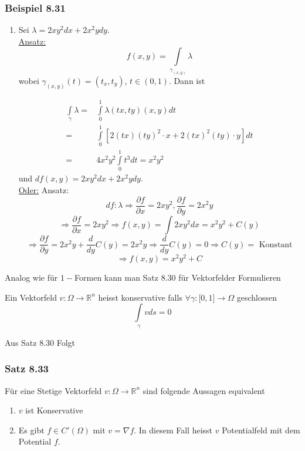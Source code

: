 \subsubsection*{Beispiel 8.31}
\begin{enumerate}
\item Sei $\lambda = 2xy^2dx+2x^2ydy$. \\

\noindent\underline{Ansatz:} $$f\left(x,y\right)=\int\limits_{\gamma_{\left( x,y\right)}}\lambda$$
wobei $\gamma_{\left( x,y\right)}\left(t\right)=\left(t_x,t_y\right)$, $t\in\left( 0,1\right)$. Dann ist
 
\begin{align*}
\int\limits_\gamma  \lambda   = &\int\limits_0^1 {\lambda \left( {tx,ty} \right)\left( {x,y} \right)dt} \\
= &\int\limits_0^1 {\left[ {2\left( {tx} \right){{\left( {ty} \right)}^2} \cdot x + 2{{\left( {tx} \right)}^2}\left( {ty} \right) \cdot y} \right]dt} \\
= & 4{x^2}{y^2}\int\limits_0^1 {{t^3}} dt = {x^2}{y^2}
\end{align*}
und $df\left( x,y\right)=2xy^2dx+2x^2ydy$.\\

\noindent\underline{Oder:} Ansatz: 
$$df:\lambda \Rightarrow\frac{\partial f}{\partial x}=  2xy^2, \frac{\partial f}{\partial y}=  2x^2y$$
$$\Rightarrow \frac{\partial f}{\partial x}=2xy^2 \Rightarrow f\left( x,y \right) = \int 2xy^2 dx =  x^2y^2+C\left( y\right)$$
$$\Rightarrow\frac{\partial f}{\partial y}=2x^2y+\frac{d}{dy}C\left(y\right)=2x^2y \Rightarrow \frac{d}{dy}C\left( y\right) =  0 \Rightarrow C\left( y\right) = \text{ Konstant}$$
$$\Rightarrow f\left( x,y\right)=  x^2y^2+C$$
\end{enumerate}
Analog wie für $1-$Formen kann man Satz 8.30 für Vektorfelder Formulieren

\begin{definition}{8.32}
Ein Vektorfeld $v:\Omega\rightarrow\mathbb{R}^n$ heisst konservative falls $\forall\gamma:\lbrack 0,1\rbrack\rightarrow\Omega$ geschlossen $$\int\limits_\gamma v ds=0$$
\end{definition}
Aus Satz 8.30 Folgt
\subsubsection*{Satz 8.33}
Für eine Stetige Vektorfeld $v:\Omega\rightarrow\mathbb{R}^n$ sind folgende Aussagen equivalent
\begin{enumerate}
\item $v$ ist Konservative
\item Es gibt $f\in C'\left( \Omega\right)$ mit $v=\nabla f$. In diesem Fall heisst $v$ Potentialfeld mit dem Potential $f$.
\end{enumerate}

